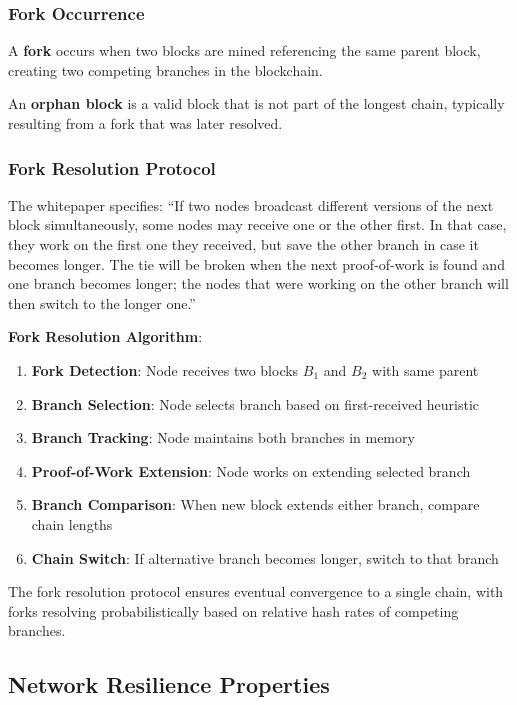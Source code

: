 \subsubsection{Fork Occurrence}

A \textbf{fork} occurs when two blocks are mined referencing the same parent block, creating two competing branches in the blockchain.

An \textbf{orphan block} is a valid block that is not part of the longest chain, typically resulting from a fork that was later resolved.

\subsubsection{Fork Resolution Protocol}

The whitepaper specifies: ``If two nodes broadcast different versions of the next block simultaneously, some nodes may receive one or the other first. In that case, they work on the first one they received, but save the other branch in case it becomes longer. The tie will be broken when the next proof-of-work is found and one branch becomes longer; the nodes that were working on the other branch will then switch to the longer one.''

\textbf{Fork Resolution Algorithm}:
\begin{enumerate}
  \item \textbf{Fork Detection}: Node receives two blocks $B_1$ and $B_2$ with same parent
  \item \textbf{Branch Selection}: Node selects branch based on first-received heuristic
  \item \textbf{Branch Tracking}: Node maintains both branches in memory
  \item \textbf{Proof-of-Work Extension}: Node works on extending selected branch
  \item \textbf{Branch Comparison}: When new block extends either branch, compare chain lengths
  \item \textbf{Chain Switch}: If alternative branch becomes longer, switch to that branch
\end{enumerate}

The fork resolution protocol ensures eventual convergence to a single chain, with forks resolving probabilistically based on relative hash rates of competing branches.

\subsection{Network Resilience Properties}
\label{subsec:network-resilience}

